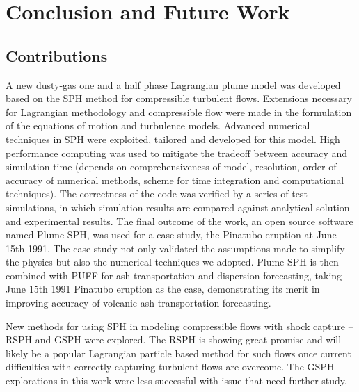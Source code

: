 \chapter{Conclusion and Future Work} \label{chapter:Future-Work}

\section{Contributions}
A new dusty-gas one and a half phase Lagrangian plume model was developed based on the SPH method for  compressible turbulent flows. Extensions necessary for Lagrangian methodology and compressible flow were made in the formulation of the equations of motion and turbulence models. Advanced numerical techniques in SPH were exploited, tailored and developed for this model. High performance computing was used to mitigate the tradeoff between accuracy  and simulation time (depends on comprehensiveness of model, resolution, order of accuracy of numerical methods, scheme for time integration and computational techniques). The correctness of the code was verified by a series of test simulations, in which simulation results are compared against analytical solution and experimental results. The final outcome of the work, an open source software named Plume-SPH, was used for a case study, the Pinatubo eruption at June 15th 1991. The case study not only validated the assumptions made to simplify the physics but also the numerical techniques we adopted. Plume-SPH is then combined with PUFF for ash transportation and dispersion forecasting, taking June 15th 1991 Pinatubo eruption as the case, demonstrating its merit in improving accuracy of volcanic ash transportation forecasting. 

New methods for using SPH in modeling compressible flows with shock capture -- RSPH and GSPH were explored. The RSPH is showing great promise and will likely be a popular Lagrangian particle based method for such flows once current difficulties with correctly capturing turbulent flows are overcome. The GSPH explorations in this work were less successful with issue that need further study.

